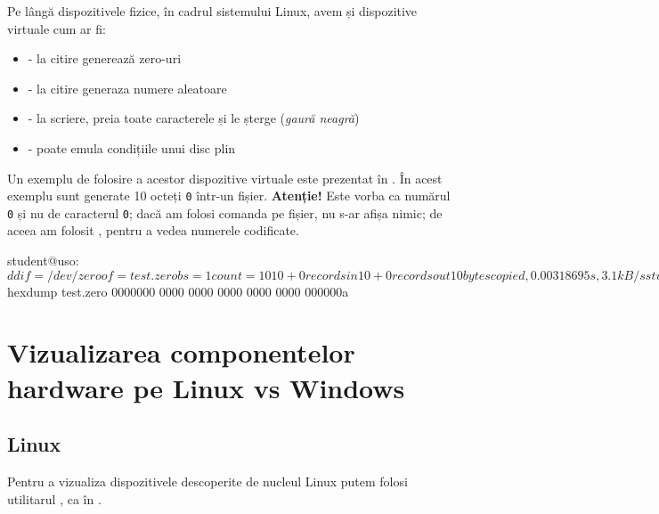 Pe lângă dispozitivele fizice, în cadrul sistemului Linux, avem și dispozitive virtuale cum ar fi:

\begin{itemize}
	\item {} - la citire generează zero-uri
	\item {} - la citire generaza numere aleatoare
	\item {} - la scriere, preia toate caracterele și le
          șterge (\textit{gaură neagră})
	\item {} - poate emula condițiile unui disc plin
\end{itemize}

Un exemplu de folosire a acestor dispozitive virtuale este prezentat în . În acest exemplu sunt generate 10 octeți \texttt{0} într-un fișier. \textbf{Atenție!} Este vorba ca numărul \texttt{0} și nu de caracterul \texttt{0}; dacă am folosi comanda  pe fișier, nu s-ar afișa nimic; de aceea am folosit
, pentru a vedea numerele codificate.

\begin{screen}[caption={Folosirea dispozitivelor virtuale},label={lst:hw:copy-dev-zero}]
student@uso:~$ dd if=/dev/zero of=test.zero bs=1 count=10
10+0 records in
10+0 records out
10 bytes copied, 0.00318695 s, 3.1 kB/s
student@uso:~$ hexdump test.zero
0000000 0000 0000 0000 0000 0000
000000a
\end{screen}

\section{Vizualizarea componentelor hardware pe Linux vs Windows}
\label{sec:hw:view}

\subsection{Linux}
\label{sec:hw:view:linux}

Pentru a vizualiza dispozitivele descoperite de nucleul Linux putem folosi utilitarul , ca în .


